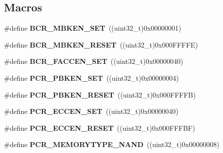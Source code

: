 \subsection*{Macros}
\begin{DoxyCompactItemize}
\item 
\hypertarget{group___f_s_m_c_ga74722cb031b5a30c066e627474507e1e}{\#define {\bfseries B\-C\-R\-\_\-\-M\-B\-K\-E\-N\-\_\-\-S\-E\-T}~((uint32\-\_\-t)0x00000001)}\label{group___f_s_m_c_ga74722cb031b5a30c066e627474507e1e}

\item 
\hypertarget{group___f_s_m_c_ga6190926e03187065960cdbe9353632be}{\#define {\bfseries B\-C\-R\-\_\-\-M\-B\-K\-E\-N\-\_\-\-R\-E\-S\-E\-T}~((uint32\-\_\-t)0x000\-F\-F\-F\-F\-E)}\label{group___f_s_m_c_ga6190926e03187065960cdbe9353632be}

\item 
\hypertarget{group___f_s_m_c_ga298d32354d8909737fa2db42cec1d343}{\#define {\bfseries B\-C\-R\-\_\-\-F\-A\-C\-C\-E\-N\-\_\-\-S\-E\-T}~((uint32\-\_\-t)0x00000040)}\label{group___f_s_m_c_ga298d32354d8909737fa2db42cec1d343}

\item 
\hypertarget{group___f_s_m_c_ga99ff48346c662edaacb98c754dbe8ce1}{\#define {\bfseries P\-C\-R\-\_\-\-P\-B\-K\-E\-N\-\_\-\-S\-E\-T}~((uint32\-\_\-t)0x00000004)}\label{group___f_s_m_c_ga99ff48346c662edaacb98c754dbe8ce1}

\item 
\hypertarget{group___f_s_m_c_ga3c5233208c7403c4ab1751912519fb2b}{\#define {\bfseries P\-C\-R\-\_\-\-P\-B\-K\-E\-N\-\_\-\-R\-E\-S\-E\-T}~((uint32\-\_\-t)0x000\-F\-F\-F\-F\-B)}\label{group___f_s_m_c_ga3c5233208c7403c4ab1751912519fb2b}

\item 
\hypertarget{group___f_s_m_c_ga77fb3dbb94b45bf205281a3b8c7c57db}{\#define {\bfseries P\-C\-R\-\_\-\-E\-C\-C\-E\-N\-\_\-\-S\-E\-T}~((uint32\-\_\-t)0x00000040)}\label{group___f_s_m_c_ga77fb3dbb94b45bf205281a3b8c7c57db}

\item 
\hypertarget{group___f_s_m_c_ga5d750aba62d7faea82ce2b133f3ba84e}{\#define {\bfseries P\-C\-R\-\_\-\-E\-C\-C\-E\-N\-\_\-\-R\-E\-S\-E\-T}~((uint32\-\_\-t)0x000\-F\-F\-F\-B\-F)}\label{group___f_s_m_c_ga5d750aba62d7faea82ce2b133f3ba84e}

\item 
\hypertarget{group___f_s_m_c_gaf02a07b484782f398b0684f0f0372f2f}{\#define {\bfseries P\-C\-R\-\_\-\-M\-E\-M\-O\-R\-Y\-T\-Y\-P\-E\-\_\-\-N\-A\-N\-D}~((uint32\-\_\-t)0x00000008)}\label{group___f_s_m_c_gaf02a07b484782f398b0684f0f0372f2f}

\end{DoxyCompactItemize}

